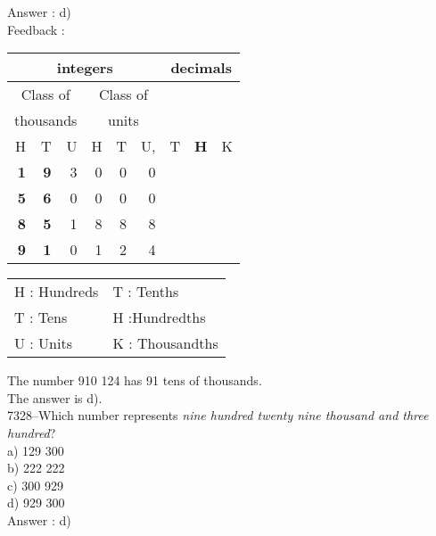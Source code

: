 \documentclass[letterpaper, 12pt]{article}
\begin{document}
Answer : d)\\

Feedback :\\

\begin{center}
\begin{tabular}{|rrr|rrr|rrr|}
\hline
\multicolumn{6}{|c|}{integers} &\multicolumn{3}{|c|}{decimals} \\
\hline
\multicolumn{3}{|c|}{Class of} &\multicolumn{3}{|c|}{Class of} &  \multicolumn{3}{c|}{} \\
\multicolumn{3}{|c|}{thousands} &\multicolumn{3}{|c|}{units} &  \multicolumn{3}{c|}{} \\
\hline
H & T & U &H & T & U, & T\up{th} & \textbf{H\up{th}} & K\up{th} \\
\hline
\hline
 \textbf{1} & \textbf{9} & 3 & 0 & 0 & 0 & & & \\
 \textbf{5} & \textbf{6} & 0 & 0 & 0 & 0 & & &\\
 \textbf{8} & \textbf{5} & 1 & 8 & 8 & 8 & & &\\
 \textbf{9} & \textbf{1} & 0 & 1 & 2 & 4 & & &\\
\hline
\end{tabular}
\end{center}

\tiny
\begin{center}
\begin{tabular}{ll}
H : Hundreds & T\up{th} : Tenths\\
T : Tens & H\up{th} :Hundredths\\
U : Units & K\up{e} : Thousandths\\
\end{tabular}
\end{center}

\normalsize

The number 910 124 has 91 tens of thousands.\\
The answer is d).\\



7328--Which number represents \textit{nine hundred twenty nine thousand and three hundred}? \\

a) 129 300\\
b) 222 222\\
c) 300 929\\
d) 929 300\\

Answer : d)\\
\end{document}

